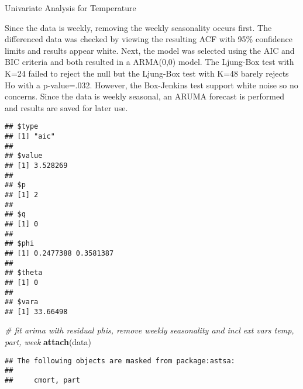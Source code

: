 \documentclass[]{article}
\newenvironment{Shaded}{\begin{snugshade}}{\end{snugshade}}
\newcommand{\KeywordTok}[1]{\textcolor[rgb]{0.13,0.29,0.53}{\textbf{#1}}}
\newcommand{\DataTypeTok}[1]{\textcolor[rgb]{0.13,0.29,0.53}{#1}}
\newcommand{\StringTok}[1]{\textcolor[rgb]{0.31,0.60,0.02}{#1}}
\newcommand{\CommentTok}[1]{\textcolor[rgb]{0.56,0.35,0.01}{\textit{#1}}}
\newcommand{\OperatorTok}[1]{\textcolor[rgb]{0.81,0.36,0.00}{\textbf{#1}}}
\newcommand{\NormalTok}[1]{#1}
\begin{document}
 Univariate Analysis for Temperature

Since the data is weekly, removing the weekly seasonality occurs first.
The differenced data was checked by viewing the resulting ACF with 95\%
confidence limits and results appear white. Next, the model was selected
using the AIC and BIC criteria and both resulted in a ARMA(0,0) model.
The Ljung-Box test with K=24 failed to reject the null but the Ljung-Box
test with K=48 barely rejects Ho with a p-value=.032. However, the
Box-Jenkins test support white noise so no concerns. Since the data is
weekly seasonal, an ARUMA forecast is performed and results are saved
for later use.

\begin{Shaded}
\end{Shaded}

\begin{verbatim}
## $type
## [1] "aic"
## 
## $value
## [1] 3.528269
## 
## $p
## [1] 2
## 
## $q
## [1] 0
## 
## $phi
## [1] 0.2477388 0.3581387
## 
## $theta
## [1] 0
## 
## $vara
## [1] 33.66498
\end{verbatim}

\begin{Shaded}
\begin{Highlighting}[]
\CommentTok{# fit arima with residual phis, remove weekly seasonality and incl ext vars temp, part, week}
\KeywordTok{attach}\NormalTok{(data)}
\end{Highlighting}
\end{Shaded}

\begin{verbatim}
## The following objects are masked from package:astsa:
## 
##     cmort, part
\end{verbatim}
\end{document}
